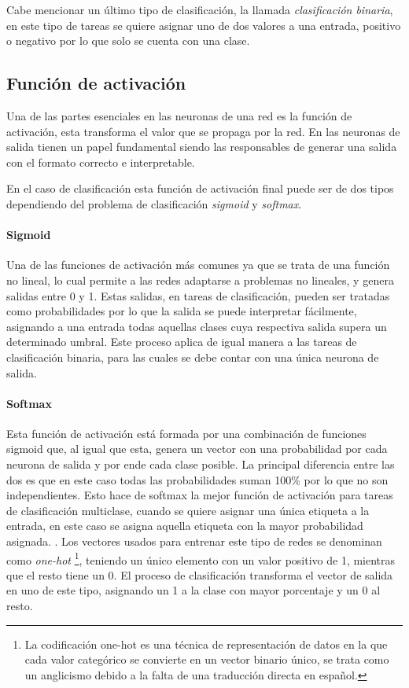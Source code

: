 Cabe mencionar un último tipo de clasificación, la llamada \textit{clasificación
binaria}, en este tipo de tareas se quiere asignar uno de dos valores a una
entrada, positivo o negativo por lo que solo se cuenta con una clase.

\subsection{Función de activación}Una de las partes esenciales en las
neuronas de una red es la función de activación, esta transforma el valor que se
propaga por la red. En las neuronas de salida tienen un papel fundamental
siendo las responsables de generar una salida con el formato correcto e
interpretable.\cite{sharma2017activation}

En el caso de clasificación esta función de activación final puede ser de dos
tipos dependiendo del problema de clasificación \textit{sigmoid} y
\textit{softmax}.\cite{Liermann2019}

\paragraph{Sigmoid} Una de las funciones de activación más comunes ya que se
trata de una función no lineal, lo cual permite a las redes adaptarse a
problemas no lineales, y genera salidas entre 0 y 1. Estas salidas, en tareas de
clasificación, pueden ser tratadas como probabilidades por lo que la salida
se puede interpretar fácilmente, asignando a una entrada todas aquellas clases
cuya respectiva salida supera un determinado umbral. Este proceso aplica de
igual manera a las tareas de clasificación binaria, para las cuales se debe
contar con una única neurona de salida. \cite{NARAYAN199769}

\paragraph{Softmax} Esta función de activación está formada por una combinación
de funciones sigmoid que, al igual que esta, genera un vector con una
probabilidad por cada neurona de salida y por ende cada clase posible. La principal
diferencia entre las dos es que en este caso todas las probabilidades suman
100\% por lo que no son independientes. Esto hace de softmax la mejor función de activación para tareas de
clasificación multiclase, cuando se quiere asignar una única etiqueta a la
entrada, en este caso se asigna aquella etiqueta con la mayor probabilidad
asignada. \cite{sharma2017activation}. Los vectores usados para entrenar este tipo de redes se denominan como \textit{one-hot} \footnote{La codificación one-hot es una técnica de representación de datos en la que cada valor categórico se convierte en un vector binario único, se trata como un anglicismo debido a la falta de una traducción directa en español.}, teniendo un único elemento con un valor positivo de 1, mientras que el resto tiene un 0. El proceso de clasificación transforma el vector de salida en uno de este tipo, asignando un 1 a la clase con mayor porcentaje y un 0 al resto.


